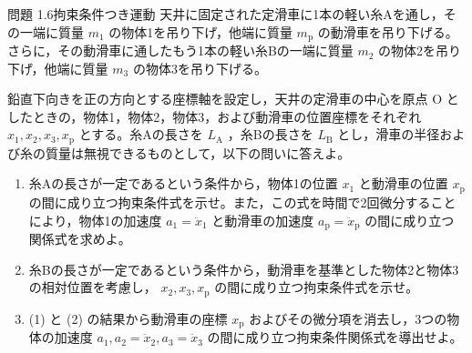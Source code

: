 \problemstart
{}

\begin{problemBox}{問題 1.6\quad 拘束条件つき運動\hspace{1.2em}{\small\mdseries 〔標準〕}}
天井に固定された定滑車に1本の軽い糸Aを通し，その一端に質量 $m_1$ の物体1を吊り下げ，他端に質量 $m_{\text{p}}$ の動滑車を吊り下げる。さらに，その動滑車に通したもう1本の軽い糸Bの一端に質量 $m_2$ の物体2を吊り下げ，他端に質量 $m_3$ の物体3を吊り下げる。
\par
鉛直下向きを正の方向とする座標軸を設定し，天井の定滑車の中心を原点 O としたときの，物体1，物体2，物体3，および動滑車の位置座標をそれぞれ $x_1, x_2, x_3, x_{\text{p}}$ とする。糸Aの長さを $L_{\text{A}}$ ，糸Bの長さを $L_{\text{B}}$ とし，滑車の半径および糸の質量は無視できるものとして，以下の問いに答えよ。

\begin{enumerate}
  \item 糸Aの長さが一定であるという条件から，物体1の位置 $x_1$ と動滑車の位置 $x_{\text{p}}$ の間に成り立つ拘束条件式を示せ。また，この式を時間で2回微分することにより，物体1の加速度 $a_1 = \ddot{x}_1$ と動滑車の加速度 $a_{\text{p}} = \ddot{x}_{\text{p}}$ の間に成り立つ関係式を求めよ。

  \item 糸Bの長さが一定であるという条件から，動滑車を基準とした物体2と物体3の相対位置を考慮し， $x_2, x_3, x_{\text{p}}$ の間に成り立つ拘束条件式を示せ。

  \item (1) と (2) の結果から動滑車の座標 $x_{\text{p}}$ およびその微分項を消去し，3つの物体の加速度 $a_1, a_2 = \ddot{x}_2, a_3 = \ddot{x}_3$ の間に成り立つ拘束条件関係式を導出せよ。
\end{enumerate}
\end{problemBox}

